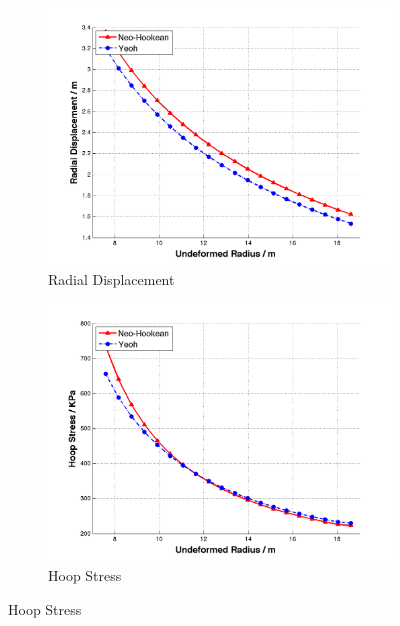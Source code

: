 \begin{figure}[t!p]
	\begin{subfigure}[b]{0.5\textwidth}
		\centering
		\includegraphics[width=\textwidth]{./figures/ur_nh_yeoh.png}
		\caption{Radial Displacement}
		\label{ur_nh_yeoh}
	\end{subfigure}
	\begin{subfigure}[b]{0.5\textwidth}
		\centering
		\includegraphics[width=\textwidth]{./figures/hoop_nh_yeoh.png}
		\caption{Hoop Stress}
		\label{hoop_nh_yeoh}
	\end{subfigure}
	

\end{figure}
